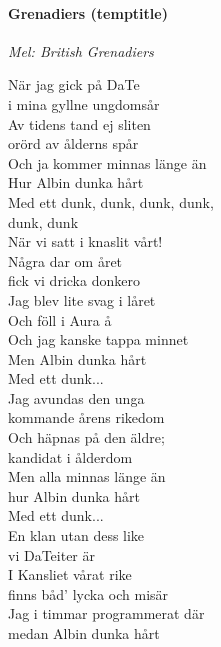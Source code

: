 \documentclass[12pt]{article}
\begin{document}
\newpage

\paragraph*{Grenadiers (temptitle)\\}
\vspace{3px}
\textit{Mel: British Grenadiers}\\

\noindent
\begin{minipage}{.45\textwidth}

	\noindent
	När jag gick på DaTe\\
	i mina gyllne ungdomsår\\
	Av tidens tand ej sliten\\
	orörd av ålderns spår\\
	Och ja kommer minnas länge än\\
	Hur Albin dunka hårt\\

	\noindent
	Med ett dunk, dunk, dunk, dunk,\\
	dunk, dunk\\
	När vi satt i knaslit vårt!\\
	
	\noindent
	Några dar om året\\
	fick vi dricka donkero\\
	Jag blev lite svag i låret\\
	Och föll i Aura å\\
	Och jag kanske tappa minnet\\
	Men Albin dunka hårt\\

	\noindent
	Med ett dunk...\\

	\noindent
	Jag avundas den unga\\
	kommande årens rikedom\\
	Och häpnas på den äldre;\\
	kandidat i ålderdom\\
	Men alla minnas länge än\\
	hur Albin dunka hårt\\

	\noindent
	Med ett dunk...\\

	\noindent
	En klan utan dess like\\
	vi DaTeiter är\\
	I Kansliet vårat rike\\
	finns båd' lycka och misär\\
	Jag i timmar programmerat där\\
	medan Albin dunka hårt\\


\end{minipage}
\end{document}
